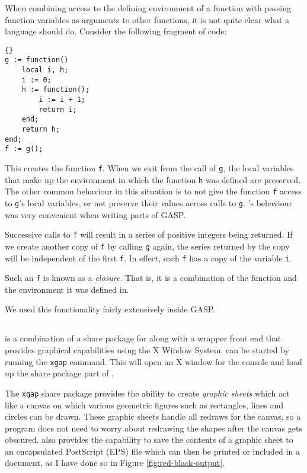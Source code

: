 When combining access to the defining environment of a function with
passing function variables as arguments to other functions, it is not
quite clear what a language should do.  Consider the following
fragment of \GAP{} code:

\begin{lstlisting}{}
g := function()
    local i, h;
    i := 0;
    h := function();
        i := i + 1;
        return i;
    end;
    return h;
end;
f := g();
\end{lstlisting}

This creates the function \texttt{f}.  When we exit from the call of
\texttt{g}, the local variables that make up the environment in which
the function \texttt{h} was defined are preserved.  The other common
behaviour in this situation is to not give the function \texttt{f}
access to \texttt{g}'s local variables, or not preserve their values
across calls to \texttt{g}.  \GAP's behaviour was very convenient when
writing parts of GASP.

Successive calls to \texttt{f} will result in a series of positive
integers being returned.  If we create another copy of \texttt{f} by
calling \texttt{g} again, the series returned by the copy will be
independent of the first \texttt{f}.  In effect, each \texttt{f} has a
copy of the variable \texttt{i}.

Such an \texttt{f} is known as a \emph{closure}.  That is, it is a
combination of the function and the environment it was defined in.

We used this functionality fairly extensively inside GASP.


\subsection{\XGAP}

\XGAP{} is a combination of a share package for \GAP{} along with a
wrapper front end that provides graphical capabilities using the X
Window System.  \XGAP{} can be started by running the \texttt{xgap}
command.  This will open an X window for the console and load up the
share package part of \XGAP{}.

The \texttt{xgap} share package provides the ability to create
\emph{graphic sheets} which act like a canvas on which various
geometric figures such as rectangles, lines and circles can be drawn.
These graphic sheets handle all redraws for the canvas, so a program
does not need to worry about redrawing the shapes after the canvas
gets obscured.  \XGAP{} also provides the capability to save the
contents of a graphic sheet to an encapsulated PostScript (EPS) file
which can then be printed or included in a document, as I have done so
in Figure \ref{fig:red-black-output}.

